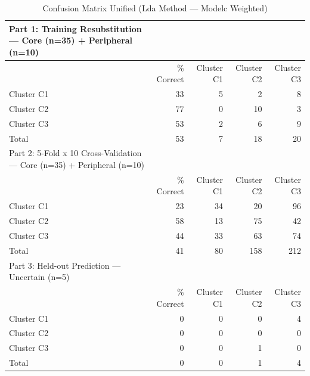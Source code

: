 \begin{table}[htbp]
  \centering
  \caption{Confusion Matrix Unified (Lda Method — Modelc Weighted)}
  \label{tab:LDA_Method_ModelC_Weighted_tables_confusion_matrix_unified}
  \begin{tabular}{lrrrr}
    \toprule
    Part 1: Training Resubstitution — Core (n=35) + Peripheral (n=10) &  &  &  &  \\
    \midrule
     & \% Correct & Cluster C1 & Cluster C2 & Cluster C3 \\
    Cluster C1 & 33 & 5 & 2 & 8 \\
    Cluster C2 & 77 & 0 & 10 & 3 \\
    Cluster C3 & 53 & 2 & 6 & 9 \\
    Total & 53 & 7 & 18 & 20 \\
    Part 2: 5-Fold x 10 Cross-Validation — Core (n=35) + Peripheral (n=10) &  &  &  &  \\
     & \% Correct & Cluster C1 & Cluster C2 & Cluster C3 \\
    Cluster C1 & 23 & 34 & 20 & 96 \\
    Cluster C2 & 58 & 13 & 75 & 42 \\
    Cluster C3 & 44 & 33 & 63 & 74 \\
    Total & 41 & 80 & 158 & 212 \\
    Part 3: Held-out Prediction — Uncertain (n=5) &  &  &  &  \\
     & \% Correct & Cluster C1 & Cluster C2 & Cluster C3 \\
    Cluster C1 & 0 & 0 & 0 & 4 \\
    Cluster C2 & 0 & 0 & 0 & 0 \\
    Cluster C3 & 0 & 0 & 1 & 0 \\
    Total & 0 & 0 & 1 & 4 \\
    \bottomrule
  \end{tabular}
\end{table}
